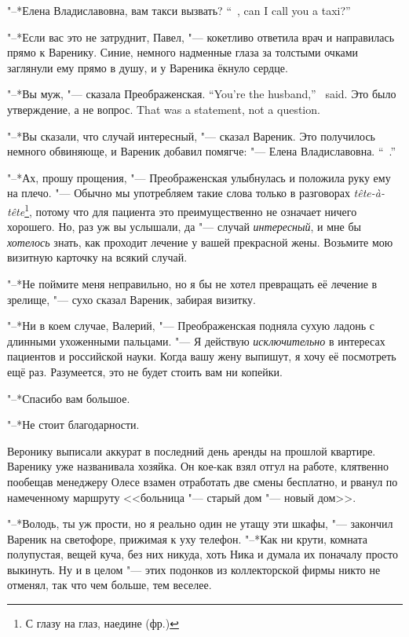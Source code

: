 {"--*Елена Владиславовна, вам такси вызвать?}
{``\Yelena\ \Vladislavovna, can I call you a taxi?''}

"--*Если вас это не затруднит, Павел, "--- кокетливо ответила врач и направилась прямо к Варенику.
Синие, немного надменные глаза за толстыми очками заглянули ему прямо в душу, и у Вареника ёкнуло сердце.

{"--*Вы муж, "--- сказала Преображенская.}
{``You're the husband,'' \Preobrazhenskaya\ said.}
{Это было утверждение, а не вопрос.}
{That was a statement, not a question.}

"--*Вы сказали, что случай интересный, "--- сказал Вареник.
Это получилось немного обвиняюще, и Вареник добавил помягче:
{"--- Елена Владиславовна.}
{``\Yelena\ \Vladislavovna.''}

"--*Ах, прошу прощения, "--- Преображенская улыбнулась и положила руку ему на плечо.
"--- Обычно мы употребляем такие слова только в разговорах \textit{tête-à-tête}\footnote{С глазу на глаз, наедине (фр.)}, потому что для пациента это преимущественно не означает ничего хорошего.
Но, раз уж вы услышали, да "--- случай \emph{интересный}, и мне бы \emph{хотелось} знать, как проходит лечение у вашей прекрасной жены.
Возьмите мою визитную карточку на всякий случай.

"--*Не поймите меня неправильно, но я бы не хотел превращать её лечение в зрелище, "--- сухо сказал Вареник, забирая визитку.

"--*Ни в коем случае, Валерий, "--- Преображенская подняла сухую ладонь с длинными ухоженными пальцами.
"--- Я действую \emph{исключительно} в интересах пациентов и российской науки.
Когда вашу жену выпишут, я хочу её посмотреть ещё раз.
Разумеется, это не будет стоить вам ни копейки.

"--*Спасибо вам большое.

"--*Не стоит благодарности.

\textspace

\asterism

\label{Wed_2012_06_20}

Веронику выписали аккурат в последний день аренды на прошлой квартире.
Варенику уже названивала хозяйка.
Он кое-как взял отгул на работе, клятвенно пообещав менеджеру Олесе взамен отработать две смены бесплатно, и рванул по намеченному маршруту <<больница "--- старый дом "--- новый дом>>.

"--*Володь, ты уж прости, но я реально один не утащу эти шкафы, "--- закончил Вареник на светофоре, прижимая к уху телефон.
"--*Как ни крути, комната полупустая, вещей куча, без них никуда, хоть Ника и думала их поначалу просто выкинуть.
Ну и в целом "--- этих подонков из коллекторской фирмы никто не отменял, так что чем больше, тем веселее.

